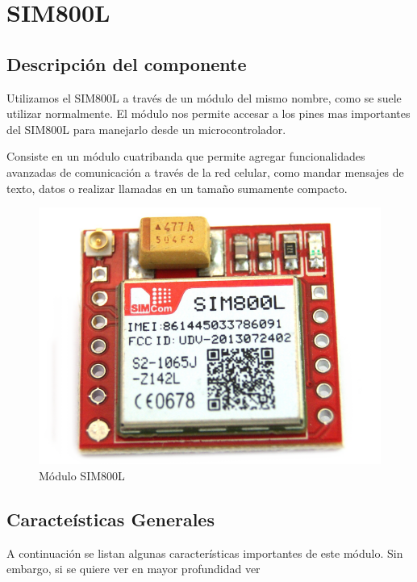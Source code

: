 \section{SIM800L} \label {cap:sim800l}

\subsection{Descripción del componente}

Utilizamos el SIM800L a través de un módulo del mismo nombre, como se suele utilizar normalmente. El módulo nos permite accesar a los pines 
mas importantes del SIM800L para manejarlo desde un microcontrolador.\par
Consiste en un módulo cuatribanda que permite agregar funcionalidades avanzadas de comunicación a través de la red celular, como mandar mensajes de texto,
datos o realizar llamadas en un tamaño sumamente compacto. 

\begin{figure}[htb]
	\centering
	\includegraphics[scale=0.2]{images/sim800l.png}
    \caption{Módulo SIM800L}
	\label{fig:sim800l}
\end{figure}

\subsection{Caracteísticas Generales}

A continuación se listan algunas características importantes de este módulo. Sin embargo, si se quiere ver en mayor profundidad ver \todo

